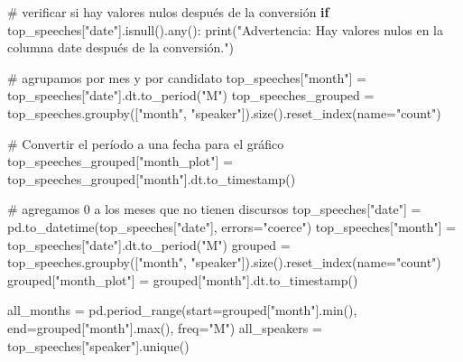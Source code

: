 \documentclass[
  letterpaper,
  DIV=11,
  numbers=noendperiod]{scrartcl}
\newenvironment{Shaded}{\begin{snugshade}}{\end{snugshade}}
\newcommand{\BuiltInTok}[1]{\textcolor[rgb]{0.00,0.23,0.31}{#1}}
\newcommand{\CommentTok}[1]{\textcolor[rgb]{0.37,0.37,0.37}{#1}}
\newcommand{\ControlFlowTok}[1]{\textcolor[rgb]{0.00,0.23,0.31}{\textbf{#1}}}
\newcommand{\NormalTok}[1]{\textcolor[rgb]{0.00,0.23,0.31}{#1}}
\newcommand{\OperatorTok}[1]{\textcolor[rgb]{0.37,0.37,0.37}{#1}}
\newcommand{\StringTok}[1]{\textcolor[rgb]{0.13,0.47,0.30}{#1}}
\begin{document}
\begin{Shaded}
\begin{Highlighting}[]
\CommentTok{\# verificar si hay valores nulos después de la conversión}
\ControlFlowTok{if}\NormalTok{ top\_speeches[}\StringTok{"date"}\NormalTok{].isnull().}\BuiltInTok{any}\NormalTok{():}
    \BuiltInTok{print}\NormalTok{(}\StringTok{"Advertencia: Hay valores nulos en la columna \textquotesingle{}date\textquotesingle{} después de la conversión."}\NormalTok{)}

\CommentTok{\# agrupamos por mes y por candidato}
\NormalTok{top\_speeches[}\StringTok{"month"}\NormalTok{] }\OperatorTok{=}\NormalTok{ top\_speeches[}\StringTok{"date"}\NormalTok{].dt.to\_period(}\StringTok{"M"}\NormalTok{)}
\NormalTok{top\_speeches\_grouped }\OperatorTok{=}\NormalTok{ top\_speeches.groupby([}\StringTok{"month"}\NormalTok{, }\StringTok{"speaker"}\NormalTok{]).size().reset\_index(name}\OperatorTok{=}\StringTok{"count"}\NormalTok{)}

\CommentTok{\# Convertir el período a una fecha para el gráfico}
\NormalTok{top\_speeches\_grouped[}\StringTok{"month\_plot"}\NormalTok{] }\OperatorTok{=}\NormalTok{ top\_speeches\_grouped[}\StringTok{"month"}\NormalTok{].dt.to\_timestamp()}

\CommentTok{\# agregamos 0 a los meses que no tienen discursos}
\NormalTok{top\_speeches[}\StringTok{"date"}\NormalTok{] }\OperatorTok{=}\NormalTok{ pd.to\_datetime(top\_speeches[}\StringTok{"date"}\NormalTok{], errors}\OperatorTok{=}\StringTok{"coerce"}\NormalTok{)}
\NormalTok{top\_speeches[}\StringTok{"month"}\NormalTok{] }\OperatorTok{=}\NormalTok{ top\_speeches[}\StringTok{"date"}\NormalTok{].dt.to\_period(}\StringTok{"M"}\NormalTok{)}
\NormalTok{grouped }\OperatorTok{=}\NormalTok{ top\_speeches.groupby([}\StringTok{"month"}\NormalTok{, }\StringTok{"speaker"}\NormalTok{]).size().reset\_index(name}\OperatorTok{=}\StringTok{"count"}\NormalTok{)}
\NormalTok{grouped[}\StringTok{"month\_plot"}\NormalTok{] }\OperatorTok{=}\NormalTok{ grouped[}\StringTok{"month"}\NormalTok{].dt.to\_timestamp()}

\NormalTok{all\_months }\OperatorTok{=}\NormalTok{ pd.period\_range(start}\OperatorTok{=}\NormalTok{grouped[}\StringTok{"month"}\NormalTok{].}\BuiltInTok{min}\NormalTok{(), end}\OperatorTok{=}\NormalTok{grouped[}\StringTok{"month"}\NormalTok{].}\BuiltInTok{max}\NormalTok{(), freq}\OperatorTok{=}\StringTok{"M"}\NormalTok{)}
\NormalTok{all\_speakers }\OperatorTok{=}\NormalTok{ top\_speeches[}\StringTok{"speaker"}\NormalTok{].unique()}


\end{Highlighting}
\end{Shaded}
\end{document}
